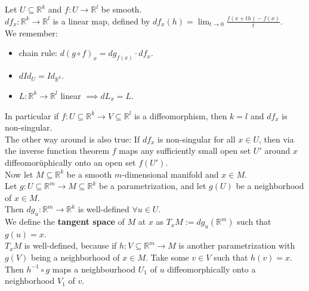 \begin{remark}\label{4.5}
    Let $U\subseteq \mathbb{R}^k$ and $f:U\to \mathbb{R}^l$ be smooth.\\
    $df_x:\mathbb{R}^k\to \mathbb{R}^l$ is a linear map, defined by $df_x(h)=\lim_{t\to 0}\frac{f(x+th)-f(x)}{t}$.\\ 
    We remember:
    \begin{itemize}
        \item chain rule: $d(g\circ f)_x=dg_{f(x)}\cdot df_x$.
        \item $dId_U=Id_{\mathbb{R}^k}$.
        \item $L:\mathbb{R}^k\to \mathbb{R}^l$ linear $\implies dL_x=L$.
    \end{itemize}
    In particular if $f:U\subseteq \mathbb{R}^k\to V\subseteq \mathbb{R}^l$ is a diffeomorphism, then $k=l$ and $df_x$ is non-singular.\\
    The other way around is also true: If $df_x$ is non-singular for all $x\in U$, then via the inverse function theorem $f$ maps any sufficiently small open set $U'$ around $x$ diffeomorüphically onto an open set $f(U')$.\\  
    Now let $M\subseteq \mathbb{R}^k$ be a smooth $m$-dimensional manifold and $x\in M$.\\
    Let $g:U\subseteq \mathbb{R}^m\to M\subseteq\mathbb{R}^k$ be a parametrization, and let $g(U)$ be a neighborhood of $x\in M$.\\
    Then $dg_u:\mathbb{R}^m\to \mathbb{R}^k$ is well-defined $\forall u\in U$.\\
    We define the \textbf{tangent space} of $M$ at $x$ as $T_xM:=dg_u(\mathbb{R}^m)$ such that $g(u)=x$.\\
    $T_xM$ is well-defined, because if $h:V\subseteq \mathbb{R}^m\to M$ is another parametrization with $g(V)$ being a neighborhood of $x\in M$. Take some $v\in V$ such that $h(v)=x$.\\
    Then $h^{-1}\circ g$ maps a neighbourhood $U_1$ of $u$ diffeomorphically onto a neighborhood $V_1$ of $v$.\\   
    \begin{center}
    \begin{minipage}{0.48\textwidth}
    \centering

\end{minipage}
\end{center}
\end{remark}

